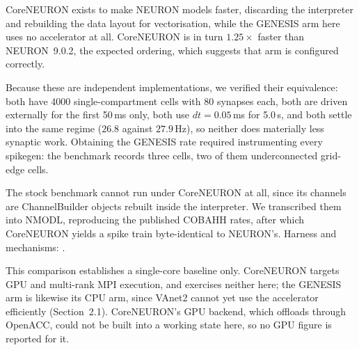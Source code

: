 \documentclass[preprint,12pt, a4paper]{elsarticle}
\begin{document}
\begin{enumerate}
CoreNEURON exists to make NEURON models faster, discarding the interpreter and rebuilding the data layout for vectorisation, while the GENESIS arm here uses no accelerator at all. CoreNEURON is in turn $1.25\times$ faster than NEURON~9.0.2, the expected ordering, which suggests that arm is configured correctly.

Because these are independent implementations, we verified their equivalence: both have 4000 single-compartment cells with 80 synapses each, both are driven externally for the first 50\,ms only, both use $dt=0.05$\,ms for 5.0\,s, and both settle into the same regime ($26.8$ against $27.9$\,Hz), so neither does materially less synaptic work. Obtaining the GENESIS rate required instrumenting every spikegen: the benchmark records three cells, two of them underconnected grid-edge cells.

The stock benchmark cannot run under CoreNEURON at all, since its channels are ChannelBuilder objects rebuilt inside the interpreter. We transcribed them into NMODL, reproducing the published COBAHH rates, after which CoreNEURON yields a spike train byte-identical to NEURON's. Harness and mechanisms: .

This comparison establishes a single-core baseline only. CoreNEURON targets GPU and multi-rank MPI execution, and exercises neither here; the GENESIS arm is likewise its CPU arm, since VAnet2 cannot yet use the accelerator efficiently (Section~2.1). CoreNEURON's GPU backend, which offloads through OpenACC, could not be built into a working state here, so no GPU figure is reported for it.


\end{enumerate}
\end{document}
